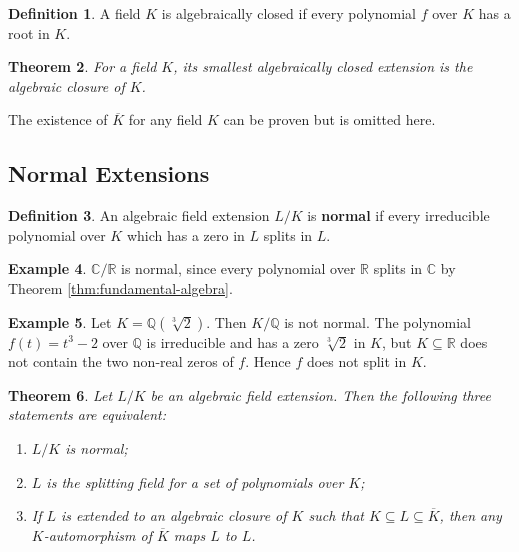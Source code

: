 \documentclass[12pt]{article}
\newtheorem{theorem}{Theorem}
\theoremstyle{definition}
\newtheorem{definition}[theorem]{Definition}
\newtheorem{example}[theorem]{Example}
\newcommand{\Q}{\mathbb Q}
\newcommand{\C}{\mathbb C}
\newcommand{\R}{\mathbb R}
\begin{document}
\begin{definition}
    A field $K$ is algebraically closed if every polynomial $f$ over $K$ has a root in $K$. 
\end{definition}

\begin{theorem}
    For a field $K$, its smallest algebraically closed extension is the algebraic closure of $K$.
\end{theorem}

The existence of $\overline K$ for any field $K$ can be proven but is omitted here. 

\subsection{Normal Extensions}


\begin{definition}
    An algebraic field extension $L/ K$ is \textbf{normal} if every irreducible polynomial over $K$ which has a zero in $L$ splits in $L$. 
\end{definition}
\begin{example}
    $\C / \R$ is normal, since every polynomial over $\R$ splits in $\C$ by Theorem \ref{thm:fundamental-algebra}.
\end{example}
\begin{example}
    Let $K = \Q(\sqrt[3]{2})$. Then $K / \Q$ is not normal. The polynomial $f(t) = t^3 - 2$ over $\Q$ is irreducible and has a zero $\sqrt[3]{2}$ in $K$, but $K \subseteq \R$ does not contain the two non-real zeros of $f$. Hence $f$ does not split in $K$.
\end{example}
\begin{theorem} \label{thm:normal-equiv-def}
    Let $L/K$ be an algebraic field extension. Then the following three statements are equivalent:
    \begin{enumerate}[label=(\roman*)]
        \item $L/K$ is normal;
        \item $L$ is the splitting field for a set of polynomials over $K$;
        \item If $L$ is extended to an algebraic closure of $K$ such that $K \subseteq L \subseteq \overline K$, then any $K$-automorphism of $\overline K$ maps $L$ to $L$. 
    \end{enumerate}
\end{theorem}
\end{document}
